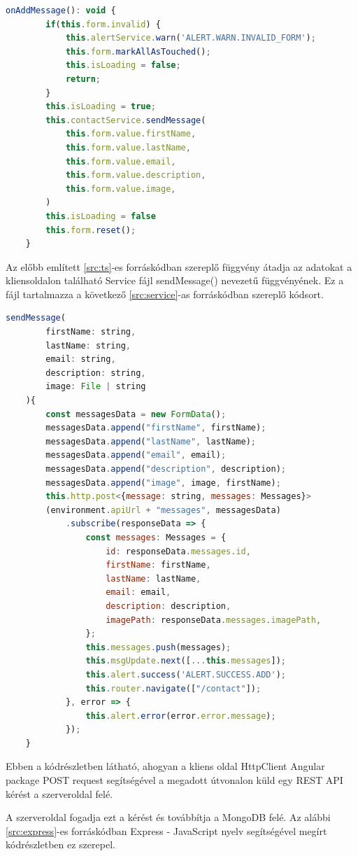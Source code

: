 \begin{lstlisting}[language=JavaScript]
	onAddMessage(): void {
		if(this.form.invalid) {
			this.alertService.warn('ALERT.WARN.INVALID_FORM');
			this.form.markAllAsTouched();
			this.isLoading = false;
			return;
		}
		this.isLoading = true;
		this.contactService.sendMessage(
			this.form.value.firstName,
			this.form.value.lastName,
			this.form.value.email,
			this.form.value.description,
			this.form.value.image,
		)
		this.isLoading = false
		this.form.reset();
	}
\end{lstlisting}

Az előbb említett \ref{src:ts}-es forráskódban szereplő függvény átadja az adatokat a kliensoldalon található Service fájl sendMessage() nevezetű függvényének. Ez a fájl tartalmazza a következő \ref{src:service}-as forráskódban szereplő kódsort.

\begin{lstlisting}[language=JavaScript]
	sendMessage(
		firstName: string, 
		lastName: string, 
		email: string, 
		description: string, 
		image: File | string
	){
		const messagesData = new FormData();
		messagesData.append("firstName", firstName);
		messagesData.append("lastName", lastName);
		messagesData.append("email", email);
		messagesData.append("description", description);
		messagesData.append("image", image, firstName);
		this.http.post<{message: string, messages: Messages}>
		(environment.apiUrl + "messages", messagesData)
			.subscribe(responseData => {
				const messages: Messages = {
					id: responseData.messages.id,
					firstName: firstName,
					lastName: lastName,
					email: email,
					description: description,
					imagePath: responseData.messages.imagePath,
				};
				this.messages.push(messages);
				this.msgUpdate.next([...this.messages]);
				this.alert.success('ALERT.SUCCESS.ADD');
				this.router.navigate(["/contact"]);
			}, error => {
				this.alert.error(error.error.message);
			});
	}
\end{lstlisting}

Ebben a kódrészletben látható, ahogyan a kliens oldal HttpClient Angular package POST request segítségével a megadott útvonalon küld egy REST API kérést a szerveroldal felé.

\bigskip
A szerveroldal fogadja ezt a kérést és továbbítja a MongoDB felé. Az alábbi \ref{src:express}-es forráskódban Express - JavaScript nyelv segítségével megírt kódrészletben ez szerepel.

